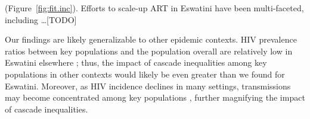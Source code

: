 \cite{SHIMS1,SHIMS2,SHIMS3} (Figure~\ref{fig:fit.inc}).
Efforts to scale-up ART in Eswatini have been multi-faceted, including \dots [TODO]
\par
Our findings are likely generalizable to other epidemic contexts.
HIV prevalence ratios between key populations and the population overall
are relatively low in Eswatini \vs elsewhere \cite{Baral2012,Hessou2019};
thus, the impact of cascade inequalities among key populations in other contexts
would likely be even greater than we found for Eswatini.
Moreover, as HIV incidence declines in many settings,
transmissions may become concentrated among key populations \cite{Brown2019,Garnett2021},
further magnifying the impact of cascade inequalities. %
\par
